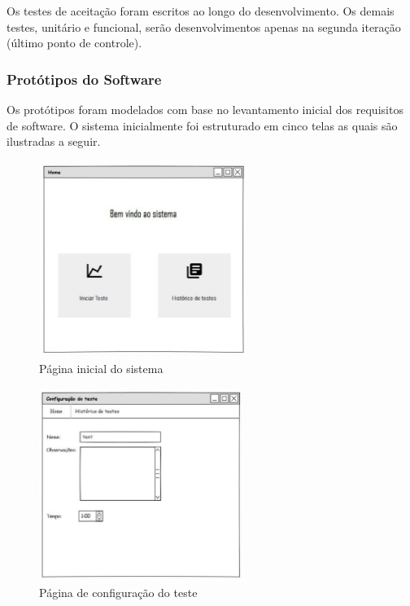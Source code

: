 

	Os testes de aceitação foram escritos ao longo do desenvolvimento. Os demais testes, unitário e funcional, serão desenvolvimentos apenas na segunda iteração (último ponto de controle).


\subsubsection{Protótipos do Software}

	Os protótipos foram modelados com base no levantamento inicial dos requisitos de software. O sistema inicialmente foi estruturado em cinco telas as quais são ilustradas a seguir.
	
	\begin{figure}[h]
		\centering
		\includegraphics[width=0.6\textwidth]{figuras/home.eps}
		\caption{Página inicial do sistema}
		\label{img:home}
	\end{figure}

		\begin{figure}[h]
		\centering
		\includegraphics[width=0.6\textwidth]{figuras/configteste.eps}
		\caption{Página de configuração do teste}
		\label{img:conf}
	\end{figure}


